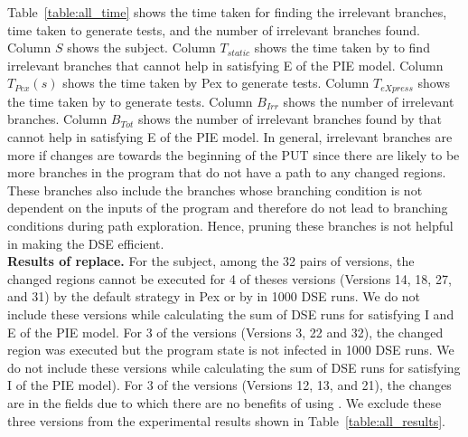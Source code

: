 Table~\ref{table:all_time} shows the time taken for finding the irrelevant branches, time taken to generate tests, and the number of irrelevant branches found. Column $S$ shows the subject. Column $T_{static}$ shows the time taken by  to find irrelevant branches that cannot help in satisfying E of the PIE model. Column $T_{Pex}(s)$ shows the time taken by Pex to generate tests. Column $T_{eXpress}$ shows the time taken by  to generate tests. Column $B_{Irr}$ shows the number of irrelevant branches. Column $B_{Tot}$ shows the number of irrelevant branches found by  that cannot help in satisfying E of the PIE model. In general, irrelevant branches are more if changes are towards the beginning of the PUT since there are likely to be more branches in the program that do not have a path to any changed regions. These branches also include the branches whose branching condition is not dependent on the inputs of the program and therefore do not lead to branching conditions during path exploration. Hence, pruning these branches is not helpful in making the DSE efficient. 
\\ \textbf{Results of replace. }For the  subject, among the 32 pairs of versions, the changed regions cannot be executed for 4 of theses versions (Versions 14, 18, 27, and 31) by the default strategy in Pex or by  in 1000 DSE runs. We do not include these versions while calculating the sum of DSE runs for satisfying I and E of the PIE model. For 3 of the versions (Versions 3, 22 and 32), the changed region was executed but the program state is not infected in 1000 DSE runs. 
We do not include these versions while calculating the sum of DSE runs for satisfying I of the PIE model). For 3 of the versions (Versions 12, 13, and 21), the changes are in the fields due to which there are no benefits of using . We exclude these three versions from the experimental results shown in Table~\ref{table:all_results}. 

